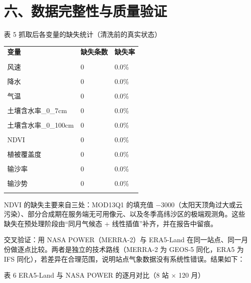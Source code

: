 \documentclass[11pt,a4paper]{ctexart}
\begin{document}
\section*{六、数据完整性与质量验证}
表 5  抓取后各变量的缺失统计（清洗前的真实状态）


\begin{table}[H]\centering\small\setlength{\parskip}{2pt}
\begin{tabularx}{\textwidth}{|X|X|X|}
\toprule
\textbf{变量} & \textbf{缺失条数} & \textbf{缺失率} \\\\
\midrule
风速 & 0 & 0.0\% \\\\
降水 & 0 & 0.0\% \\\\
气温 & 0 & 0.0\% \\\\
土壤含水率\_0\_7cm & 0 & 0.0\% \\\\
土壤含水率\_0\_100cm & 0 & 0.0\% \\\\
NDVI & 0 & 0.0\% \\\\
植被覆盖度 & 0 & 0.0\% \\\\
输沙率 & 0 & 0.0\% \\\\
输沙势 & 0 & 0.0\% \\\\
\bottomrule
\end{tabularx}
\end{table}
NDVI 的缺失主要来自三处：MOD13Q1 的填充值 −3000（太阳天顶角过大或云污染）、部分合成期在服务端无可用像元、以及冬季高纬沙区的极端观测角。这些缺失在预处理阶段由“同月气候态 + 线性插值”补齐，并在报告中留痕。

交叉验证：用 NASA POWER（MERRA-2）与 ERA5-Land 在同一站点、同一月份做逐点比较。两者是独立的技术路线（MERRA-2 为 GEOS-5 同化，ERA5 为 IFS 同化），若差异在合理范围，说明站点气象数据没有系统性错误。结果如下：

表 6  ERA5-Land 与 NASA POWER 的逐月对比（8 站 $\times$ 120 月）
\end{document}
